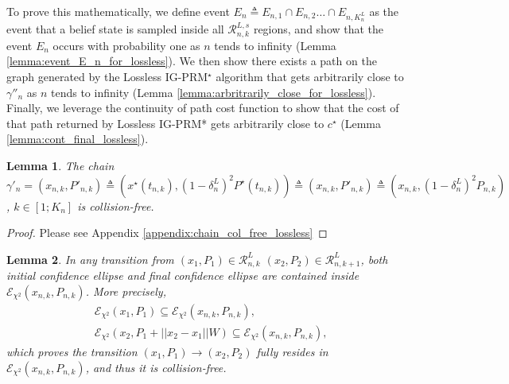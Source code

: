 \documentclass[Afour,sageh,times]{sagej}
\newtheorem{lemma}{\bf Lemma}
\begin{document}
To prove this mathematically, we define event $E_{n} \triangleq E_{n,1}\cap E_{n,2}\dots \cap E_{n,K^L_n}$ as the event that a belief state is sampled inside all $\mathcal{R}^{L,s}_{n,k}$ regions, and show that the event $E_n$ occurs with probability one as $n$ tends to infinity (Lemma \ref{lemma:event_E_n_for_lossless}). 
We then show there exists a path on the graph generated by the Lossless IG-PRM$^\star$ algorithm that gets arbitrarily close to $\gamma''_n$ as $n$ tends to infinity (Lemma \ref{lemma:arbritrarily_close_for_lossless}). Finally, we leverage the continuity of path cost function to show that the cost of that path returned by Lossless IG-PRM* gets arbitrarily close to $c^\star$ (Lemma \ref{lemma:cont_final_lossless}).
\begin{lemma}
\label{lemma:chain_col_free_lossless}
\normalfont The chain $\gamma'_n = (x_{n,k}, P'_{n,k})\triangleq (x^\star(t_{n,k}), (1-\delta^L_n)^2 P^\star(t_{n,k}))\triangleq (x_{n,k}, P'_{n,k})\triangleq (x_{n,k}, (1-\delta^L_n)^2 P_{n,k}) $, $k\in[1;K_n]$ is collision-free. 
\end{lemma}
\begin{proof}
    Please see Appendix \ref{appendix:chain_col_free_lossless}
\end{proof}
\begin{lemma}
 \normalfont In any transition from $(x_1, P_1) \in \mathcal{R}^L_{n,k}$  $(x_2, P_2) \in \mathcal{R}^L_{n,k+1}$, both initial confidence ellipse and final confidence ellipse are contained inside $\mathcal{E}_{\chi^2} (x_{n,k},P_{n,k})$. More precisely,
\begin{align}
\label{eq:init_in}
&\mathcal{E}_{\chi^2}(x_1, P_1) \subseteq \mathcal{E}_{\chi^2} (x_{n,k},P_{n,k}),
\\ \label{eq:final_in_lossless}
&\mathcal{E}_{\chi^2}(x_2, P_1+||x_2-x_1||W) \subseteq \mathcal{E}_{\chi^2} (x_{n,k},P_{n,k}),
\end{align}
which proves the transition $(x_1,P_1)\rightarrow (x_2,P_2)$ fully resides in $\mathcal{E} _{\chi^2}(x_{n,k},P_{n,k})$, and thus it is collision-free. 
\label{lemma:collision_free_lossless}
\end{lemma}
\end{document}
